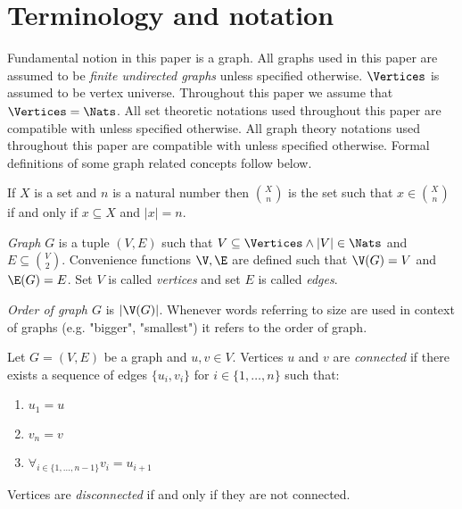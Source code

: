 
\section{Terminology and notation}

Fundamental notion in this paper is a graph. All graphs used in this paper are assumed to be \emph{finite undirected graphs} unless specified otherwise. $\Vertices$ is assumed to be vertex universe. Throughout this paper we assume that $\Vertices = \Nats$. All set theoretic notations used throughout this paper are compatible with \cite{jech} unless specified otherwise. All graph theory notations used throughout this paper are compatible with \cite{bollobas} unless specified otherwise. Formal definitions of some graph related concepts follow below.

\begin{defi}
    If $X$ is a set and $n$ is a natural number then $\binom{X}{n}$ is the set such that $x \in \binom{X}{n}$ if and only if $x \subseteq X$ and $|x| = n$.
\end{defi}

\begin{defi}
    \emph{Graph} $G$ is a tuple $(V,E)$ such that $V \subseteq \Vertices \land |V| \in \Nats$ and $E \subseteq \binom{V}{2}$. Convenience functions $\V, \E$ are defined such that $\V(G) = V$ and $\E(G) = E$. Set $V$ is called \emph{vertices} and set $E$ is called \emph{edges}.
\end{defi}

\begin{defi}
    \emph{Order of graph $G$} is $|\V(G)|$. Whenever words referring to size are used in context of graphs (e.g. "bigger", "smallest") it refers to the order of graph.
\end{defi}

\begin{defi}
    Let $G = (V,E)$ be a graph and $u, v \in V$. Vertices $u$ and $v$ are \emph{connected} if there exists a sequence of edges $\{u_i,v_i\}$ for $i \in \{1, \ldots, n\}$ such that:
    \begin{enumerate}
        \item $u_1 = u$
        \item $v_n = v$
        \item $\forall_{i \in \{1, \ldots, n - 1\}} v_i = u_{i+1}$
    \end{enumerate}

    Vertices are \emph{disconnected} if and only if they are not connected.
\end{defi}

